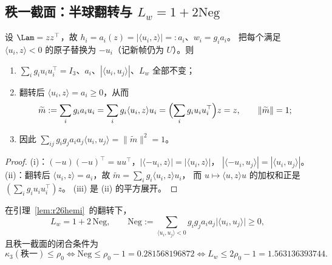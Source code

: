 \subsection{秩一截面：半球翻转与 $L_w=1+2\mathrm{Neg}$}\label{sec:r26:rank1}

\begin{lemma}[半球翻转]\label{lem:r26hemi}
设 $\Lam=zz^\top$，故 $h_i=a_i(z)=|\langle u_i,z\rangle|=:a_i$、$w_i=g_ia_i$。
把每个满足 $\langle u_i,z\rangle<0$ 的原子替换为 $-u_i$（记新帧仍为 $U$）。则
\begin{enumerate}[label=(\roman*),leftmargin=2.2em,itemsep=1pt]
\item $\sum_ig_iu_iu_i^\top=I_3$、$a_i$、$|\langle u_i,u_j\rangle|$、$L_w$ 全部不变；
\item 翻转后 $\langle u_i,z\rangle=a_i\ge0$，从而
\begin{equation}\label{eq:r26hemi}
\widetilde m:=\sum_ig_ia_iu_i=\sum_ig_i\langle u_i,z\rangle u_i
=\Bigl(\sum_ig_iu_iu_i^\top\Bigr)z=z,\qquad \|\widetilde m\|=1 ;
\end{equation}
\item 因此 $\sum_{ij}g_ig_ja_ia_j\langle u_i,u_j\rangle=\|\widetilde m\|^2=1$。
\end{enumerate}
\end{lemma}

\begin{proof}
(i)：$(-u)(-u)^\top=uu^\top$，$|\langle -u_i,z\rangle|=|\langle u_i,z\rangle|$，
$|\langle -u_i,u_j\rangle|=|\langle u_i,u_j\rangle|$。
(ii)：翻转后 $\langle u_i,z\rangle=a_i$，故 $\widetilde m=\sum_ig_i\langle u_i,z\rangle u_i$，
而 $u\mapsto\langle u,z\rangle u$ 的加权和正是 $(\sum_ig_iu_iu_i^\top)z$。
(iii) 是 (ii) 的平方展开。
\end{proof}

\begin{proposition}[秩一截面的纯几何形式]\label{prop:r26rank1}
在引理~\ref{lem:r26hemi}~的翻转下，
\begin{equation}\label{eq:r26r1}
L_w=1+2\,\mathrm{Neg},\qquad
\mathrm{Neg}:=\sum_{\langle u_i,u_j\rangle<0}g_ig_ja_ia_j\bigl|\langle u_i,u_j\rangle\bigr|\ge0 ,
\end{equation}
且秩一截面的闭合条件为
\begin{equation}\label{eq:r26r2}
\kappa_3(\text{秩一})\le\rho_0\iff\mathrm{Neg}\le\rho_0-1=0.281568196872
\iff L_w\le2\rho_0-1=1.563136393744 .
\end{equation}
\end{proposition}

